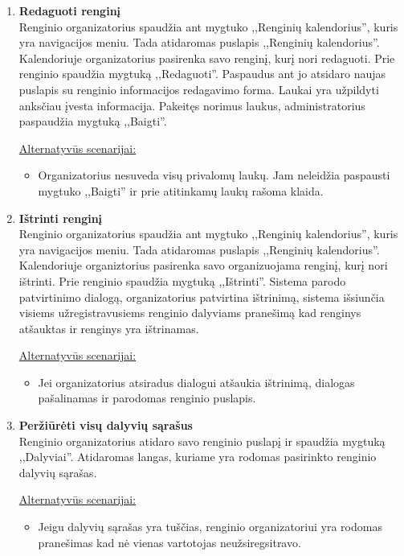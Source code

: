 \documentclass{VUMIFPSkursinis}
\begin{document}
\begin{enumerate} [label = \textbf{U\arabic*.}]
			\item \textbf{Redaguoti renginį}   \\
					Renginio organizatorius spaudžia ant mygtuko ,,Renginių kalendorius'', kuris yra navigacijos meniu. Tada atidaromas puslapis ,,Renginių kalendorius''. Kalendoriuje organizatorius pasirenka savo renginį, kurį nori redaguoti. Prie renginio spaudžia mygtuką ,,Redaguoti''. Paspaudus ant jo atsidaro naujas puslapis su renginio informacijos redagavimo forma. Laukai yra užpildyti anksčiau įvesta informacija. Pakeitęs norimus laukus, administratorius paspaudžia mygtuką ,,Baigti''.
					
					\underline{Alternatyvūs scenarijai:}
					\begin{itemize}
						\item Organizatorius nesuveda visų privalomų laukų. Jam neleidžia paspausti mygtuko ,,Baigti'' ir prie atitinkamų laukų rašoma klaida.
					\end{itemize}
			
			\item \textbf{Ištrinti renginį}   \\
					Renginio organizatorius spaudžia ant mygtuko ,,Renginių kalendorius'', kuris yra navigacijos meniu. Tada atidaromas puslapis ,,Renginių kalendorius''. Kalendoriuje organiztorius pasirenka savo organizuojama renginį, kurį nori ištrinti. Prie renginio spaudžia mygtuką ,,Ištrinti''. Sistema parodo patvirtinimo dialogą, organizatorius patvirtina ištrinimą, sistema išsiunčia visiems užregistravusiems renginio dalyviams pranešimą kad renginys atšauktas ir renginys yra ištrinamas.
					
					\underline{Alternatyvūs scenarijai:}
					\begin{itemize}
						\item Jei organizatorius atsiradus dialogui atšaukia ištrinimą, dialogas pašalinamas ir parodomas renginio puslapis.
					\end{itemize}	
				
			\item \textbf{Peržiūrėti visų dalyvių sąrašus}   \\
					Renginio organizatorius atidaro savo renginio puslapį ir spaudžia mygtuką ,,Dalyviai''. Atidaromas langas, kuriame yra rodomas pasirinkto renginio dalyvių sąrašas.
					
					\underline{Alternatyvūs scenarijai:}
					\begin{itemize}
						\item Jeigu dalyvių sąrašas yra tuščias, renginio organizatoriui yra rodomas pranešimas kad nė vienas vartotojas neužsiregsitravo.
					\end{itemize}	
				

\end{enumerate}
\end{document}
